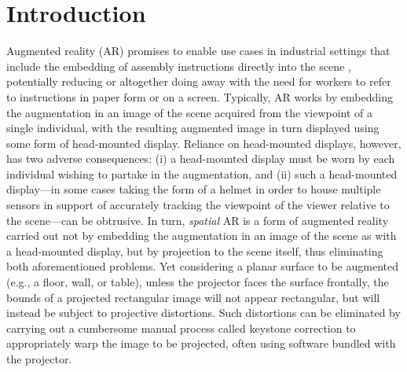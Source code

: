 \documentclass[review]{elsarticle}
\begin{document}
\linenumbers

\section{Introduction}\label{sec:intro}

Augmented reality (AR) \cite{van2010survey,zhou2008trends} promises to enable use cases in industrial settings that include the embedding of assembly instructions directly into the scene \cite{schlund2018moglichkeiten,masood2019augmented,gattullo2019towards,rupprecht2020information,Rupprecht2021}, potentially reducing or altogether doing away with the need for workers to refer to instructions in paper form or on a screen. Typically, AR works by embedding the augmentation in an image of the scene acquired from the viewpoint of a single individual, with the resulting augmented image in turn displayed using some form of head-mounted display. Reliance on head-mounted displays, however, has two adverse consequences: (i) a head-mounted display must be worn by each individual wishing to partake in the augmentation, and (ii) such a head-mounted display---in some cases taking the form of a helmet in order to house multiple sensors in support of accurately tracking the viewpoint of the viewer relative to the scene---can be obtrusive. In turn, \textit{spatial} AR\cite{bimber2019spatial} is a form of augmented reality carried out not by embedding the augmentation in an image of the scene as with a head-mounted display, but by projection to the scene itself, thus eliminating both aforementioned problems. Yet considering a planar surface to be augmented (e.g., a floor, wall, or table), unless the projector faces the surface frontally, the bounds of a projected rectangular image will not appear rectangular, but will instead be subject to projective distortions. Such distortions can be eliminated by carrying out a cumbersome manual process called keystone correction to appropriately warp the image to be projected, often using software bundled with the projector.
\end{document}
